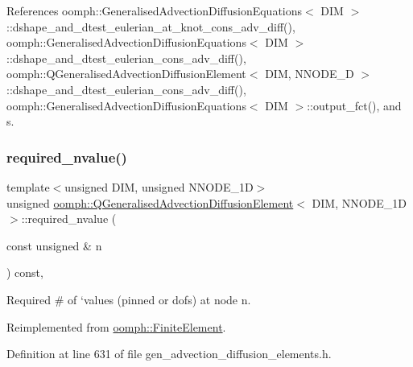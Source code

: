 References oomph\+::\+Generalised\+Advection\+Diffusion\+Equations$<$ D\+I\+M $>$\+::dshape\+\_\+and\+\_\+dtest\+\_\+eulerian\+\_\+at\+\_\+knot\+\_\+cons\+\_\+adv\+\_\+diff(), oomph\+::\+Generalised\+Advection\+Diffusion\+Equations$<$ D\+I\+M $>$\+::dshape\+\_\+and\+\_\+dtest\+\_\+eulerian\+\_\+cons\+\_\+adv\+\_\+diff(), oomph\+::\+Q\+Generalised\+Advection\+Diffusion\+Element$<$ D\+I\+M, N\+N\+O\+D\+E\+\_\+D $>$\+::dshape\+\_\+and\+\_\+dtest\+\_\+eulerian\+\_\+cons\+\_\+adv\+\_\+diff(), oomph\+::\+Generalised\+Advection\+Diffusion\+Equations$<$ D\+I\+M $>$\+::output\+\_\+fct(), and s.

\mbox{\label{classoomph_1_1QGeneralisedAdvectionDiffusionElement_acd259476019fc5a54a1925777527bd38}} 
\subsubsection{\texorpdfstring{required\+\_\+nvalue()}{required\_nvalue()}}
{\footnotesize\ttfamily template$<$unsigned D\+IM, unsigned N\+N\+O\+D\+E\+\_\+1D$>$ \\
unsigned \hyperlink{classoomph_1_1QGeneralisedAdvectionDiffusionElement}{oomph\+::\+Q\+Generalised\+Advection\+Diffusion\+Element}$<$ D\+IM, N\+N\+O\+D\+E\+\_\+1D $>$\+::required\+\_\+nvalue (\begin{DoxyParamCaption}\item[{const unsigned \&}]{n }\end{DoxyParamCaption}) const\hspace{0.3cm}{\ttfamily [inline]}, {\ttfamily [virtual]}}



Required \# of `values\textquotesingle{} (pinned or dofs) at node n. 



Reimplemented from \hyperlink{classoomph_1_1FiniteElement_a56610c60d5bc2d7c27407a1455471b1a}{oomph\+::\+Finite\+Element}.



Definition at line 631 of file gen\+\_\+advection\+\_\+diffusion\+\_\+elements.\+h.



